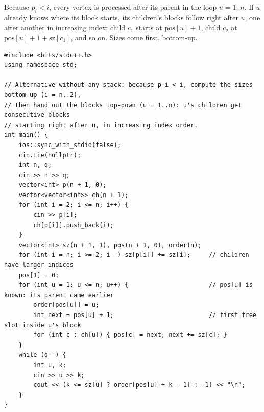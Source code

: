 \begin{alternativebox}
Because $p_i < i$, every vertex is processed after its parent in the loop $u = 1..n$. If $u$ already knows where its block starts, its children's blocks follow right after $u$, one after another in increasing index: child $c_1$ starts at $\mathrm{pos}[u]+1$, child $c_2$ at $\mathrm{pos}[u]+1+\mathrm{sz}[c_1]$, and so on. Sizes come first, bottom-up.

\begin{lstlisting}[style=cpp]
#include <bits/stdc++.h>
using namespace std;

// Alternative without any stack: because p_i < i, compute the sizes bottom-up (i = n..2),
// then hand out the blocks top-down (u = 1..n): u's children get consecutive blocks
// starting right after u, in increasing index order.
int main() {
    ios::sync_with_stdio(false);
    cin.tie(nullptr);
    int n, q;
    cin >> n >> q;
    vector<int> p(n + 1, 0);
    vector<vector<int>> ch(n + 1);
    for (int i = 2; i <= n; i++) {
        cin >> p[i];
        ch[p[i]].push_back(i);
    }
    vector<int> sz(n + 1, 1), pos(n + 1, 0), order(n);
    for (int i = n; i >= 2; i--) sz[p[i]] += sz[i];     // children have larger indices
    pos[1] = 0;
    for (int u = 1; u <= n; u++) {                      // pos[u] is known: its parent came earlier
        order[pos[u]] = u;
        int next = pos[u] + 1;                          // first free slot inside u's block
        for (int c : ch[u]) { pos[c] = next; next += sz[c]; }
    }
    while (q--) {
        int u, k;
        cin >> u >> k;
        cout << (k <= sz[u] ? order[pos[u] + k - 1] : -1) << "\n";
    }
}
\end{lstlisting}

\begin{diagrambox}
\end{diagrambox}


\end{alternativebox}
